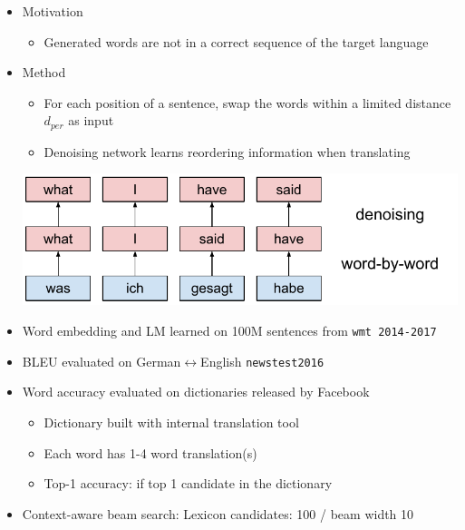 \documentclass[11pt, a4paper, landscape]{article}
\begin{document}
\NewPage
{}	
\begin{itemize}
	\item Motivation
	\begin{itemize}
		\item Generated words are not in a correct sequence of the target language
	\end{itemize}
	\item Method
	\begin{itemize}
		\item For each position of a sentence, swap the words within a limited distance $d_{per}$ as input
		\item Denoising network learns reordering information when translating
	\end{itemize}
	\begin{center}
		\vspace{0.5em}
		\hspace{-1cm}\includegraphics[width=0.8\linewidth]{denoising}
	\end{center}\vspace{0.5em}
\end{itemize}	



	
	\NewPage
	\vfill
	\begin{itemize}
	\item Word embedding and LM learned on 100M sentences from \texttt{wmt 2014-2017}
	\item BLEU evaluated on German$\leftrightarrow$English \texttt{newstest2016}
	\item {Word accuracy evaluated on  dictionaries released by Facebook}
		\begin{itemize}
			\item Dictionary built with internal translation tool
			\item Each word has 1-4 word translation(s)
			\item Top-1 accuracy: if top 1 candidate in the dictionary			
		\end{itemize}
	\item Context-aware beam search: Lexicon candidates: 100 / beam width 10

	 
	\end{itemize}
	\vfill
\NewPage
{}
\vfill
\end{document}
